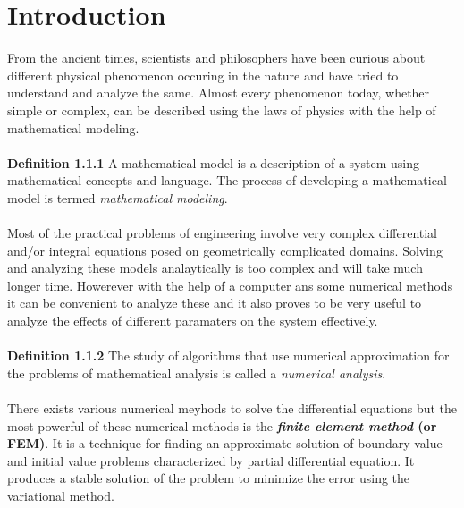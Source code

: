 \documentclass{report}
\begin{document}
\section{Introduction}
\begin{spacing}{1.5}
From the ancient times, scientists and philosophers have been curious about different physical phenomenon occuring in the nature and have tried to understand and analyze the same. Almost every phenomenon today, whether simple or complex, can be described using the laws of physics with the help of mathematical modeling.\\ \\
\textbf{Definition 1.1.1} A mathematical model is a description of a system using mathematical concepts and language. The process of developing a mathematical model is termed \textsl{mathematical modeling}.\\ \\
Most of the practical problems of engineering involve very complex differential and/or integral equations posed on geometrically complicated domains. Solving and analyzing these models analaytically is too complex and will take much longer time. Howerever with the help of a computer ans some numerical methods it can be convenient to analyze these and it also proves to be very useful to analyze the effects of different paramaters on the system effectively. \\ \\
\textbf{Definition 1.1.2}  The study of algorithms that use numerical approximation for the problems of mathematical analysis is called a \textsl{numerical analysis}.\\ \\ 
There exists various numerical meyhods to solve the differential equations but the most powerful of these numerical methods is the \textbf{\textsl{finite element method} (or FEM)}. It is a technique for finding an approximate solution of boundary value and initial value problems characterized by partial differential equation. It produces a stable solution of the problem to minimize the error using the variational method.
\end{spacing}
\end{document}
